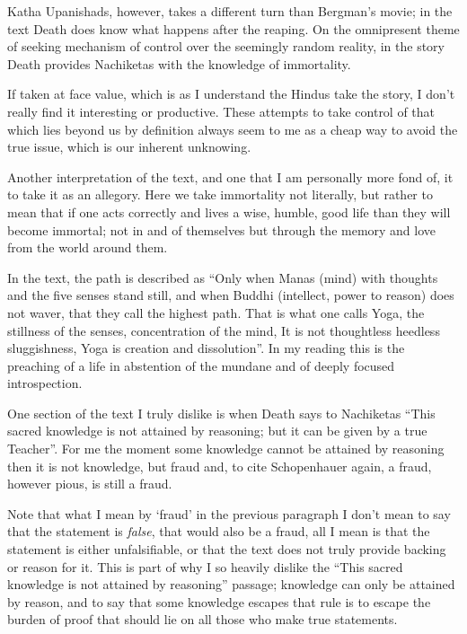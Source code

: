 \documentclass[12pt,letterpaper]{article}
\begin{document}
\begin{spacing}{2}
    Katha Upanishads, however, takes a different turn than Bergman's movie; in
    the text Death does know what happens after the reaping. On the omnipresent
    theme of seeking mechanism of control over the seemingly random reality, in
    the story Death provides Nachiketas with the knowledge of immortality.

    If taken at face value, which is as I understand the Hindus take the story,
    I don't really find it interesting or productive. These attempts to take
    control of that which lies beyond us by definition always seem to me as a
    cheap way to avoid the true issue, which is our inherent unknowing.

    Another interpretation of the text, and one that I am personally more fond
    of, it to take it as an allegory. Here we take immortality not literally,
    but rather to mean that if one acts correctly and lives a wise, humble, good
    life than they will become immortal; not in and of themselves but through
    the memory and love from the world around them.

    In the text, the path is described as ``Only when Manas (mind) with
    thoughts and the five senses stand still, and when Buddhi (intellect,
    power to reason) does not waver, that they call the highest path. That is
    what one calls Yoga, the stillness of the senses, concentration of the mind,
    It is not thoughtless heedless sluggishness, Yoga is creation and
    dissolution''. In my reading this is the preaching of a life in abstention
    of the mundane and of deeply focused introspection.

    One section of the text I truly dislike is when Death says to Nachiketas
    ``This sacred knowledge is not attained by reasoning; but it can be given by
    a true Teacher''. For me the moment some knowledge cannot be attained by
    reasoning then it is not knowledge, but fraud and, to cite Schopenhauer
    again, a fraud, however pious, is still a fraud.

    Note that what I mean by `fraud' in the previous paragraph I don't
    mean to say that the statement is \emph{false}, that would also be a fraud,
    all I mean is that the statement is either unfalsifiable, or that the text
    does not truly provide backing or reason for it. This is part of why I so
    heavily dislike the ``This sacred knowledge is not attained by reasoning''
    passage; knowledge can only be attained by reason, and to say that some
    knowledge escapes that rule is to escape the burden of proof that should lie
    on all those who make true statements.


\end{spacing}
\end{document}
